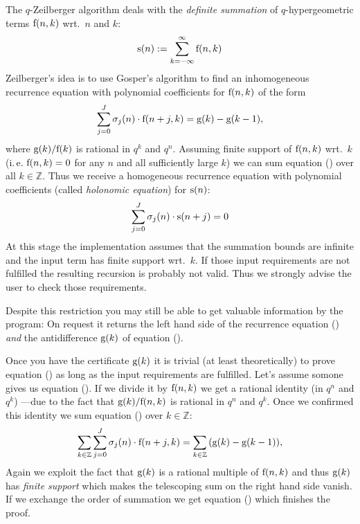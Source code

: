 The $q$-Zeilberger algorithm \cite{Koornwinder:93}
deals with the {\sl definite summation} of
$q$-hyper\-geo\-metric terms ${\mathrm f}(n,k)$ wrt.\ $n$ and $k$:
\[
	{\mathrm s}(n):= \sum_{k=-\infty}^\infty{{\mathrm f}(n,k)}
\]
Zeilberger's idea is to use Gosper's algorithm to find an
inhomogeneous recurrence equation with polynomial coefficients
for ${\mathrm f}(n,k)$ of the form
\begin{equation} \label{eq:f_n_k-recursion}
	\sum_{j=0}^J{{\mathrm \sigma}_{j}(n)\cdot {\mathrm f}(n+j,k)} =
	{\mathrm g}(k)-{\mathrm g}(k-1),
\end{equation}
where ${\mathrm g}(k)/{\mathrm f}(k)$ is rational in $q^k$ and $q^n$.
Assuming finite support of ${\mathrm f}(n,k)$ wrt.\ $k$
(i.\,e. ${\mathrm f}(n,k)=0$ for any $n$ and all sufficiently large $k$)
we can sum equation () over all $k\in\mathbb{Z}$.
Thus we receive a homogeneous recurrence equation with polynomial
coefficients (called {\sl holonomic equation}) for ${\mathrm s}(n)$:
\begin{equation} \label{holonomic_recurrence}
	\sum_{j=0}^J{{\mathrm \sigma}_{j}(n)\cdot {\mathrm s}(n+j)} = 0
\end{equation}
%
At this stage the implementation assumes that the summation
bounds are infinite and the input term has finite support wrt.\ $k$.
If those input requirements are not fulfilled the resulting
recursion is probably not valid. Thus we strongly advise the user to
check those requirements.

Despite this restriction you may still be able to get valuable
information by the program: On request it returns the
left hand side of the recurrence equation ()
\textsl{and} the antidifference ${\mathrm g}(k)$ of equation
().

Once you have the certificate ${\mathrm g}(k)$ it is trivial
(at least theoretically) to prove equation ()
as long as the input requirements are fulfilled. Let's assume
somone gives us equation (). If we divide
it by ${\mathrm f}(n,k)$ we get a rational identity (in $q^n$ and $q^k$)
---due to the fact that ${\mathrm g}(k)/{\mathrm f}(n,k)$ is rational in
$q^n$ and $q^k$. Once we confirmed this identity we sum equation
() over $k\in\mathbb{Z}$:
\begin{equation}
	\sum_{k\in\mathbb{Z}}\sum_{j=0}^J{{\mathrm \sigma}_{j}(n)\cdot {\mathrm f}(n+j,k)} =
	\sum_{k\in\mathbb{Z}}{\left({\mathrm g}(k)-{\mathrm g}(k-1)\right)},
\end{equation}
Again we exploit the
fact that ${\mathrm g}(k)$ is a rational multiple of ${\mathrm f}(n,k)$ and thus
${\mathrm g}(k)$ has \textsl{finite support} which makes the telescoping sum
on the right hand side vanish. If we exchange the order of summation we
get equation () which finishes the proof.


